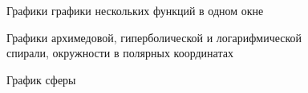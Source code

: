 \documentclass[10pt, a5paper]{article}
\begin{document}
\begin{figure}[ht]
\caption{Графики графики нескольких функций в одном окне}
\label{pic:1}
\end{figure}

\begin{figure}[ht]
\caption{ Графики архимедовой, гиперболической и логарифмической спирали, окружности в полярных координатах}
\label{pic:2}
\end{figure}

\begin{figure}[ht]
\caption{График сферы}
\label{pic:3}
\end{figure}
\end{document}
